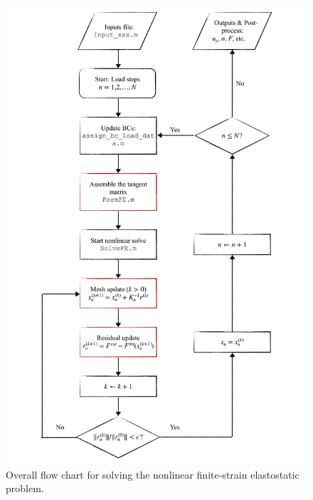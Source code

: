 \begin{figure}[!ht]
    \centering
    \includegraphics[width=0.9\linewidth]{final/part1/flow_chart_all.pdf}
    \caption{Overall flow chart for solving the nonlinear finite-strain elastostatic problem.}    
    \label{fig:final1_flow_chart_all}
\end{figure}
